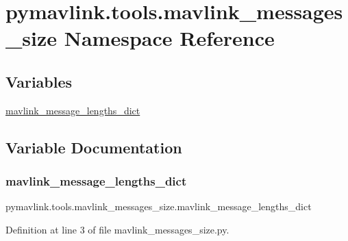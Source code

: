 \hypertarget{namespacepymavlink_1_1tools_1_1mavlink__messages__size}{}\section{pymavlink.\+tools.\+mavlink\+\_\+messages\+\_\+size Namespace Reference}
\label{namespacepymavlink_1_1tools_1_1mavlink__messages__size}
\subsection*{Variables}
\begin{DoxyCompactItemize}
\item 
\mbox{\hyperlink{namespacepymavlink_1_1tools_1_1mavlink__messages__size_a5c5b12f65ee19e51847bf806721f1f22}{mavlink\+\_\+message\+\_\+lengths\+\_\+dict}}
\end{DoxyCompactItemize}


\subsection{Variable Documentation}
\mbox{\label{namespacepymavlink_1_1tools_1_1mavlink__messages__size_a5c5b12f65ee19e51847bf806721f1f22}} 
\subsubsection{\texorpdfstring{mavlink\_message\_lengths\_dict}{mavlink\_message\_lengths\_dict}}
{\footnotesize\ttfamily pymavlink.\+tools.\+mavlink\+\_\+messages\+\_\+size.\+mavlink\+\_\+message\+\_\+lengths\+\_\+dict}



Definition at line 3 of file mavlink\+\_\+messages\+\_\+size.\+py.

